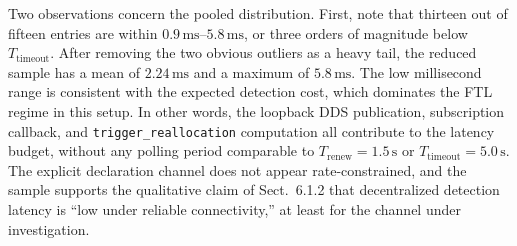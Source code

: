 \begin{table}[htbp]
\centering
\caption{Failure-to-Reallocation Latency (FTL) by experimental condition, three samples each.}
\label{tab:ftl_by_condition}
\end{table}

Two observations concern the pooled distribution. First, note that thirteen out of fifteen entries are within $0.9\,\text{ms}$--$5.8\,\text{ms}$, or three orders of magnitude below $T_{\text{timeout}}$. After removing the two obvious outliers as a heavy tail, the reduced sample has a mean of $2.24\,\text{ms}$ and a maximum of $5.8\,\text{ms}$. The low millisecond range is consistent with the expected detection cost, which dominates the FTL regime in this setup. In other words, the loopback DDS publication, subscription callback, and \texttt{trigger\_reallocation} computation all contribute to the latency budget, without any polling period comparable to $T_{\text{renew}} = 1.5\,\text{s}$ or $T_{\text{timeout}} = 5.0\,\text{s}$. The explicit declaration channel does not appear rate-constrained, and the sample supports the qualitative claim of Sect.~6.1.2 that decentralized detection latency is ``low under reliable connectivity,'' at least for the channel under investigation.

